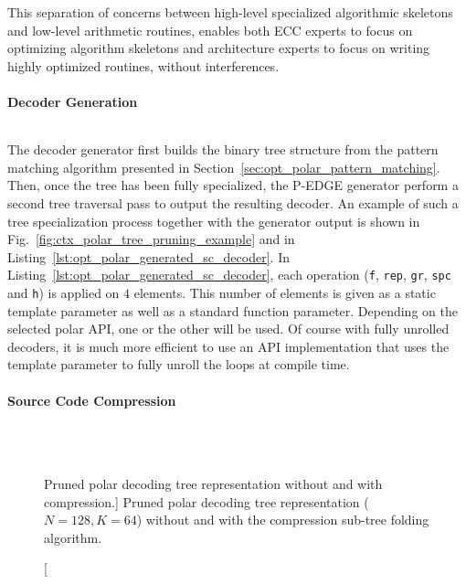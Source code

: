 This separation of concerns between high-level specialized algorithmic skeletons
and low-level arithmetic routines, enables both ECC experts to focus on
optimizing algorithm skeletons and architecture experts to focus on writing
highly optimized routines, without interferences.

\paragraph{Decoder Generation}

\begin{listing}[htp]
  \inputminted[frame=lines,linenos]{C++}{\curChapter/src/polar/generated_sc_decoder.cpp}
  \caption{The final code generated corresponding to the pruned tree in
    Fig.~\ref{fig:ctx_polar_tree_pruning_example}.}
  \label{lst:opt_polar_generated_sc_decoder}
\end{listing}

The decoder generator first builds the binary tree structure from the pattern
matching algorithm presented in Section~\ref{sec:opt_polar_pattern_matching}.
Then, once the tree has been fully specialized, the P-EDGE generator perform a
second tree traversal pass to output the resulting decoder. An example of such a
tree specialization process together with the generator output is shown in
Fig.~\ref{fig:ctx_polar_tree_pruning_example} and in
Listing~\ref{lst:opt_polar_generated_sc_decoder}. In
Listing~\ref{lst:opt_polar_generated_sc_decoder}, each operation (\verb|f|,
\verb|rep|, \verb|gr|, \verb|spc| and \verb|h|) is applied on $4$ elements. This
number of elements is given as a static template parameter as well as a standard
function parameter. Depending on the selected polar API, one or the other will
be used. Of course with fully unrolled decoders, it is much more efficient to
use an API implementation that uses the template parameter to fully unroll the
loops at compile time.

\paragraph{Source Code Compression}

\begin{figure}[htp]
  \centering
  \\
  \\
  \caption
    [Pruned polar decoding tree representation without and with compression.]
    {Pruned polar decoding tree representation ($N = 128, K = 64$) without
    and with the compression sub-tree folding algorithm.}
  \label{fig:opt_polar_sc_gen_compression}
\end{figure}

